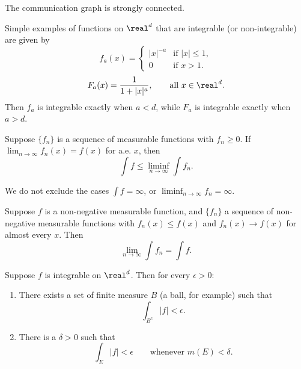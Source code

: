 \begin{assumption}
The communication graph is strongly connected.
\end{assumption}

\begin{example}
  Simple examples of functions on $\real^d$ that are integrable
  (or non-integrable) are given by
  \begin{equation}
    f_a(x) =
    \begin{cases}
      |x|^{-a} & \text{if } |x| \le 1, \\
      0        & \text{if } x > 1.
    \end{cases}
  \end{equation}
  \begin{equation}
    F_a(x) = \frac{1}{1 + |x|^a}, \qquad \text{all } x \in \real^d.
  \end{equation}
  Then $f_a$ is integrable exactly when $a < d$, while $F_a$ is integrable
  exactly when $a > d$.
\end{example}

\begin{lemma}[Fatou]
  Suppose $\{f_n\}$ is a sequence of measurable functions with $f_n \geq 0$.
  If $\lim_{n \to \infty} f_n(x) = f(x)$ for a.e. $x$, then
  \begin{equation}
    \int f \le \liminf_{n \to \infty} \int f_n.
  \end{equation}
\end{lemma}

\begin{remark}
  We do not exclude the cases $\int f = \infty$,
  or $\liminf_{n \to \infty} f_n = \infty$.
\end{remark}

\begin{corollary}
  Suppose $f$ is a non-negative measurable function, and $\{f_n\}$ a sequence
  of non-negative measurable functions with
  $f_n(x) \le f(x)$ and $f_n(x) \to f(x)$ for almost every $x$. Then
  \begin{equation}
    \lim_{n \to \infty} \int f_n = \int f.
  \end{equation}
\end{corollary}

\begin{proposition}
  Suppose $f$ is integrable on $\real^d$. Then for every $\epsilon > 0$:
  \begin{enumerate}
    \renewcommand{\theenumi}{\roman{enumi}}
    \item There exists a set of finite measure $B$ (a ball, for example) such
      that
      \begin{equation}
        \int_{B^c} |f| < \epsilon.
      \end{equation}
    \item There is a $\delta > 0$ such that
      \begin{equation}
        \int_E |f| < \epsilon \qquad \text{whenever } m(E) < \delta.
      \end{equation}
  \end{enumerate}
\end{proposition}

